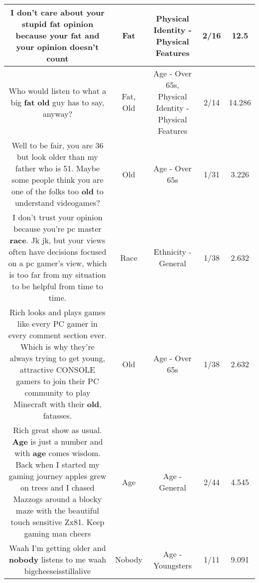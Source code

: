 \documentclass[11pt]{article}
\newlength\mylength
\begin{document}
\begin{center}
\begin{longtable}{|C{.65\mylength}|C{.30\mylength}|C{.12\mylength}|C{.12\mylength}|C{.12\mylength}|}
  \small I don't care about your stupid \textbf{fat} opinion because your \textbf{fat} and your opinion doesn't count\normalsize   & Fat & Physical Identity - Physical Features & 2/16 & 12.5 \\  \hline
  \small Who would listen to what a big \textbf{fat} \textbf{old} guy has to say, anyway?\normalsize   & Fat, Old & Age - Over 65s, Physical Identity - Physical Features & 2/14 & 14.286 \\  \hline
  \small Well to be fair, you are 36 but look older than my father who is 51. Maybe some people think you are one of the folks too \textbf{old} to understand videogames?\normalsize   & Old & Age - Over 65s & 1/31 & 3.226 \\  \hline
  \small I don't trust your opinion because you're pc master \textbf{race}. Jk jk, but your views often have decisions focused on a pc gamer's view, which is too far from my situation to be helpful from time to time.\normalsize   & Race & Ethnicity - General & 1/38 & 2.632 \\  \hline
  \small Rich looks and plays games like every PC gamer in every comment section ever. Which is why they're always trying to get young, attractive CONSOLE gamers to join their PC community to play Minecraft with their \textbf{old}, fatasses.\normalsize   & Old & Age - Over 65s & 1/38 & 2.632 \\  \hline
  \small Rich great show as usual. \textbf{Age} is just a number and with \textbf{age} comes wisdom. Back when I started my gaming journey apples grew on trees and I chased Mazzogs around a blocky maze with the beautiful touch sensitive Zx81. Keep gaming man cheers\normalsize   & Age & Age - General & 2/44 & 4.545 \\  \hline
  \small Waah I'm getting older and \textbf{nobody} listens to me waah bigcheeseisstillalive\normalsize   & Nobody & Age - Youngsters & 1/11 & 9.091 \\  \hline

\end{longtable}
\end{center}
\end{document}
